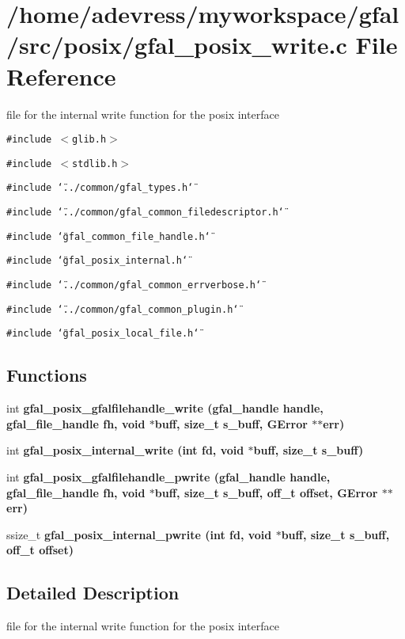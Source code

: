 \section{/home/adevress/myworkspace/gfal/src/posix/gfal\_\-posix\_\-write.c File Reference}
\label{gfal__posix__write_8c}
file for the internal write function for the posix interface 

{\tt \#include $<$glib.h$>$}\par
{\tt \#include $<$stdlib.h$>$}\par
{\tt \#include \char`\"{}../common/gfal\_\-types.h\char`\"{}}\par
{\tt \#include \char`\"{}../common/gfal\_\-common\_\-filedescriptor.h\char`\"{}}\par
{\tt \#include \char`\"{}gfal\_\-common\_\-file\_\-handle.h\char`\"{}}\par
{\tt \#include \char`\"{}gfal\_\-posix\_\-internal.h\char`\"{}}\par
{\tt \#include \char`\"{}../common/gfal\_\-common\_\-errverbose.h\char`\"{}}\par
{\tt \#include \char`\"{}../common/gfal\_\-common\_\-plugin.h\char`\"{}}\par
{\tt \#include \char`\"{}gfal\_\-posix\_\-local\_\-file.h\char`\"{}}\par
\subsection*{Functions}
\begin{CompactItemize}
\item 
int \bf{gfal\_\-posix\_\-gfalfilehandle\_\-write} (gfal\_\-handle handle, gfal\_\-file\_\-handle fh, void $\ast$buff, size\_\-t s\_\-buff, GError $\ast$$\ast$err)
\item 
int \bf{gfal\_\-posix\_\-internal\_\-write} (int fd, void $\ast$buff, size\_\-t s\_\-buff)
\item 
int \bf{gfal\_\-posix\_\-gfalfilehandle\_\-pwrite} (gfal\_\-handle handle, gfal\_\-file\_\-handle fh, void $\ast$buff, size\_\-t s\_\-buff, off\_\-t offset, GError $\ast$$\ast$err)
\item 
ssize\_\-t \bf{gfal\_\-posix\_\-internal\_\-pwrite} (int fd, void $\ast$buff, size\_\-t s\_\-buff, off\_\-t offset)
\end{CompactItemize}


\subsection{Detailed Description}
file for the internal write function for the posix interface 

